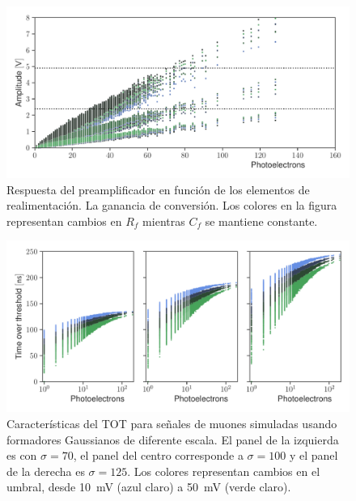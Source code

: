 \begin{figure}
        \centering
        \includegraphics[width=\textwidth]{phe-cal.pdf}
        \caption{Respuesta del preamplificador en función de los elementos de realimentación. La ganancia de conversión. Los colores en la figura representan cambios en $R_{f}$ mientras $C_{f}$ se mantiene constante.}
        \label{fig:phe-cal}
\end{figure}


\begin{figure}
        \centering
        \includegraphics[width=\textwidth]{tot_d30par.pdf}
        \caption{Características del TOT para señales de muones simuladas usando formadores Gaussianos de diferente escala. El panel de la izquierda es con $\sigma=70$, el panel del centro corresponde a $\sigma=100$ y el panel de la derecha es $\sigma=125$. Los colores representan cambios en el umbral, desde \SI{10}{\milli\volt} (azul claro) a \SI{50}{\milli\volt} (verde claro).}
        \label{fig:tot-sigma}
\end{figure}


